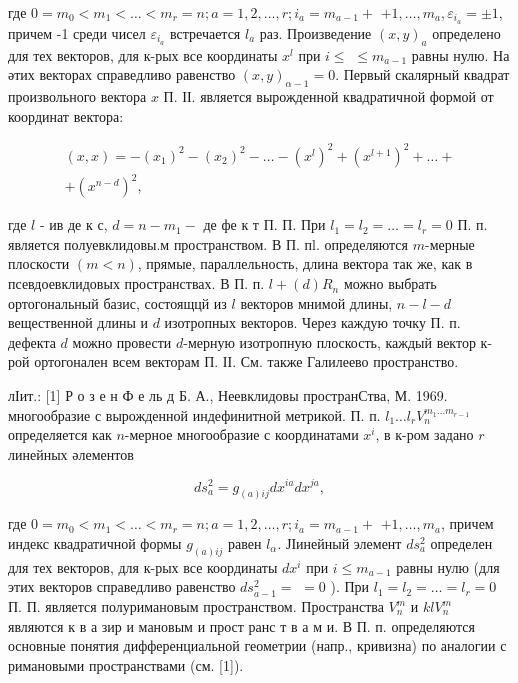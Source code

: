 \documentclass[10pt]{article}
\begin{document}
где $0=m_{0}<m_{1}<\ldots<m_{r}=n ; a=1,2, \ldots, r ; i_{a}=m_{a-1}+$ $+1, \ldots, m_{a}, \varepsilon_{i_{a}}= \pm 1$, причем -1 среди чисел $\varepsilon_{i_{a}}$ встречается $l_{a}$ раз. Произведение $(x, y)_{a}$ определено для тех векторов, для к-рых все координаты $x^{l}$ при $i \leqslant$ $\leqslant m_{a-1}$ равны нулю. На әтих векторах справедливо равенство $(x, y)_{\alpha-1}=0$. Первый скалярный квадрат произвольного вектора $x$ П. ІІ. является вырожденной квадратичной формой от координат вектора:



\[

\begin{gathered}

(x, x)=-\left(x_{1}\right)^{2}-\left(x_{2}\right)^{2}-\ldots-\left(x^{l}\right)^{2}+\left(x^{l+1}\right)^{2}+\ldots+ \\

+\left(x^{n-d}\right)^{2},

\end{gathered}

\]



где $l$ - ив де к с, $d=n-m_{1}-$ де фе к т П. П. При $l_{1}=l_{2}=\ldots=l_{r}=0$ П. п. является полуевклидовы.м пространством. В П. пl. определяются $m$-мерные плоскости $(m<n)$, прямые, параллельность, длина вектора так же, как в псевдоевклидовых пространствах. В П. п. $l+(d) R_{n}$ можно выбрать ортогональный базис, состоящцй из $l$ векторов мнимой длины, $n-l-d$ вещественной длины и $d$ изотропных векторов. Через каждую точку П. п. дефекта $d$ можно провести $d$-мерную изотропную плоскость, каждый вектор к-рой ортогонален всем векторам П. ІІ. См. также Галилеево пространство.



лІит.: [1] Р о з е н Ф е ль д Б. А., Неевклидовы пространСтва, М. 1969. многообразие с вырожденной индефинитной метрикой. П. п. $l_{1} \ldots l_{r} V_{n}^{m_{1} \ldots m_{r-1}}$ определяется как $n$-мерное многообразие с координатами $x^{i}$, в к-ром задано $r$ линейных әлементов



\[

d s_{a}^{2}=g_{(a) i j} d x^{i a} d x^{j a},

\]



где $0=m_{0}<m_{1}<\ldots<m_{r}=n ; a=1,2, \ldots, r ; i_{a}=m_{a-1}+$ $+1, \ldots, m_{a}$, причем индекс квадратичной формы $g_{(a) i j}$ равен $l_{\alpha}$. ЈІинейный элемент $d s_{a}^{2}$ определен для тех векторов, для к-рых все координаты $d x^{i}$ при $i \leqslant m_{a-1}$ равны нулю (для этих векторов справедливо равенство $d s_{a-1}^{2}=$ $=0$ ). При $l_{1}=l_{2}=\ldots=l_{r}=0$ П. П. является полуримановым пространством. Пространства $V_{n}^{m}$ и $k l V_{n}^{m}$ являются к в а зир и мановым и прост ранс т в а м и. В П. п. определяются основные понятия дифференциальной геометрии (напр., кривизна) по аналогии с римановыми пространствами (см. [1]).
\end{document}
